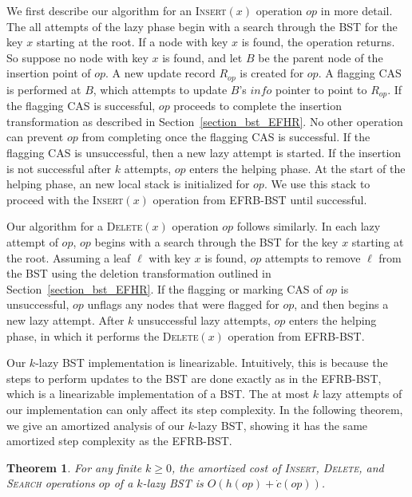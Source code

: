 \documentclass[letterpaper]{article}
\newtheorem{theorem}{Theorem}[]
\newcommand{\info}{\mathit{info}}
\begin{document}
We first describe our algorithm for an \textsc{Insert}$(x)$ operation $op$ in more detail. The all attempts of the lazy phase begin with a search through the BST for the key $x$ starting at the root. If a node with key $x$ is found, the operation returns. So suppose no node with key $x$ is found, and let $B$ be the parent node of the insertion point of $op$. A new update record $R_{op}$ is created for $op$. A flagging CAS is performed at $B$, which attempts to update $B$'s $\info$ pointer to point to $R_{op}$. If the flagging CAS is successful, $op$ proceeds to complete the insertion transformation as described in Section~\ref{section_bst_EFHR}. No other operation can prevent $op$ from completing once the flagging CAS is successful. If the flagging CAS is unsuccessful, then a new lazy attempt is started. If the insertion is not successful after $k$ attempts, $op$ enters the helping phase. At the start of the helping phase, an new local stack is initialized for $op$. We use this stack to proceed with the \textsc{Insert}$(x)$ operation from EFRB-BST until successful.

Our algorithm for a \textsc{Delete}$(x)$ operation $op$ follows similarly. In each lazy attempt of $op$, $op$ begins with a search through the BST for the key $x$ starting at the root. Assuming a leaf $\ell$ with key $x$ is found, $op$ attempts to remove $\ell$ from the BST using the deletion transformation outlined in Section~\ref{section_bst_EFHR}. If the flagging or marking CAS of $op$ is unsuccessful, $op$ unflags any nodes that were flagged for $op$, and then begins a new lazy attempt. After $k$ unsuccessful lazy attempts, $op$ enters the helping phase, in which it performs the \textsc{Delete}$(x)$ operation from EFRB-BST.

Our $k$-lazy BST implementation is linearizable. Intuitively, this is because the steps to perform updates to the BST are done exactly as in the EFRB-BST, which is a linearizable implementation of a BST. The at most $k$ lazy attempts of our implementation can only affect its step complexity. In the following theorem, we give an amortized analysis of our $k$-lazy BST, showing it has the same amortized step complexity as the EFRB-BST.

\begin{theorem}
For any finite $k \geq 0$, the amortized cost of \textsc{Insert}, \textsc{Delete}, and \textsc{Search} operations $op$ of a $k$-lazy BST is $O(h(op) + \dot{c}(op))$.
\end{theorem}
\end{document}
